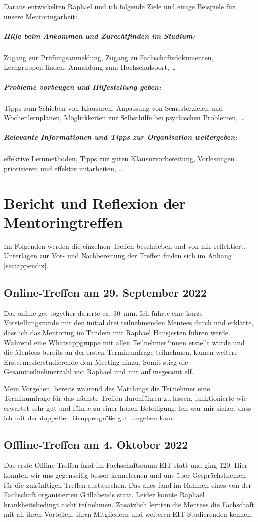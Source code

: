 \documentclass[
    paper=a4,
    div=calc,
    numbers=noendperiod,
    twocolumn,
]{scrartcl}
\begin{document}
    Daraus entwickelten Raphael und ich folgende Ziele und einige Beispiele für unsere Mentoringarbeit:

    \subparagraph{Hilfe beim Ankommen und Zurechtfinden im Studium:}
        Zugang zur Prüfungsanmeldung, Zugang zu Fachschaftsdokumenten, Lerngruppen finden, Anmeldung zum Hochschulsport, \dots

    \subparagraph{Probleme vorbeugen und Hilfestellung geben:}
        Tipps zum Schieben von Klausuren, Anpassung von Semesterzielen und Wochenlernplänen, Möglichkeiten zur Selbsthilfe bei psychischen Problemen, \dots

    \subparagraph{Relevante Informationen und Tipps zur Organisation weitergeben:}
        effektive Lernmethoden, Tipps zur guten Klausurvorbereitung, Vorlesungen priorisieren und effektiv mitarbeiten, \dots

\section{Bericht und Reflexion der Mentoringtreffen}
    Im Folgenden werden die einzelnen Treffen beschrieben und von mir reflektiert. Unterlagen zur Vor- und Nachbereitung der Treffen finden sich im Anhang \ref{sec:appendix}. 

    \subsection{Online-Treffen am 29. September 2022}
        Das online-get-together dauerte ca. \SI{30}{\minute}. Ich führte eine kurze Vorstellungsrunde mit den initial drei teilnehmenden Mentees durch und erklärte, dass ich das Mentoring im Tandem mit Raphael Hansjosten führen werde. Während eine Whatsappgruppe mit allen Teilnehmer*innen erstellt wurde und die Mentees bereits an der ersten Terminumfrage teilnahmen, kamen weitere Erstsemesterstudierende dem Meeting hinzu. Somit stieg die Gesamtteilnehmerzahl von Raphael und mir auf insgesamt elf.

        Mein Vorgehen, bereits während des Matchings die Teilnehmer eine Terminumfrage für das nächste Treffen durchführen zu lassen, funktionierte wie erwartet sehr gut und führte zu einer hohen Beteiligung. Ich war mir sicher, dass ich mit der doppelten Gruppengröße gut umgehen kann.

    \subsection{Offline-Treffen am 4. Oktober 2022}
        Das erste Offline-Treffen fand im Fachschaftsraum EIT statt und ging \SI{120}{\min}. Hier konnten wir uns gegenseitig besser kennelernen und uns über Gesprächsthemen für die zukünftigen Treffen austauschen. Das alles fand im Rahmen eines von der Fachschaft organisierten Grillabends statt. Leider konnte Raphael krankheitsbedingt nicht teilnehmen. Zusätzlich lernten die Mentees die Fachschaft mit all ihren Vorteilen, ihren Mitgliedern und weiteren EIT-Studierenden kennen.
\end{document}
